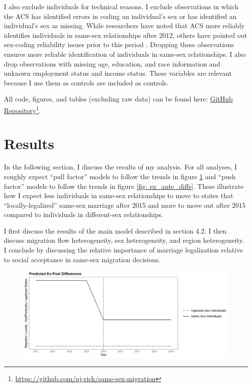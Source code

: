 \documentclass[12pt,letterpaper]{article}
\begin{document}
I also exclude individuals for technical reasons. I exclude observations in which the ACS has identified errors in coding an individual’s sex or has identified an individual’s sex as missing. While researchers have noted that ACS more reliably identifies individuals in same-sex relationships after 2012, others have pointed out sex-coding reliability issues prior to this period \citep{3, 5, 7, 12}. Dropping these observations ensures more reliable identification of individuals in same-sex relationships. I also drop observations with missing age, education, and race information and unknown employment status and income status. These variables are relevant because I use them as controls are included as controls. 

All code, figures, and tables (excluding raw data) can be found here: \href{https://github.com/nj-rich/same-sex-migration}{GitHub Repository}\footnote{\url{https://github.com/nj-rich/same-sex-migration}}.

\clearpage
\section{Results}
In the following section, I discuss the results of my analysis. For all analyses, I roughly expect “pull factor” models to follow the trends in figure \ref{fig: ex_post_diffs} and “push factor” models to follow the trends in figure \ref{fig: ex_ante_diffs}. These illustrate how I expect less individuals in same-sex relationships to move to states that “locally-legalized” same-sex marriage after 2015 and more to move out after 2015 compared to individuals in different-sex relationships.

I first discuss the results of the main model described in section 4.2. I then discuss migration flow heterogeneity, sex heterogeneity, and region heterogeneity. I conclude by discussing the relative importance of marriage legalization relative to social acceptance in same-sex migration decisions.

\begin{figure}[h]
    \includegraphics[width=0.75\linewidth]{outputs/summary_stats/ex_post_diffs.png}
    \centering
    \caption{}
    \label{fig: ex_post_diffs}
\end{figure}
\end{document}
